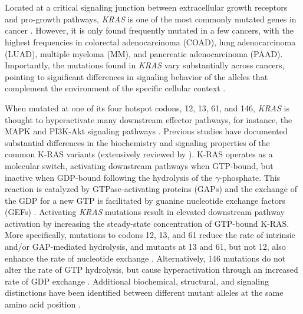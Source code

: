 \documentclass[english, 10pt, letterpaper]{article}
\newcommand{\KRAS}{\emph{KRAS}}
\newcommand{\kras}{K-RAS}
\begin{document}
\section*{}

Located at a critical signaling junction between extracellular growth receptors and pro-growth pathways, \KRAS{} is one of the most commonly mutated genes in cancer \cite{Simanshu2017, Bailey2018}.
However, it is only found frequently mutated in a few cancers, with the highest frequencies in colorectal adenocarcinoma (COAD), lung adenocarcinoma (LUAD), multiple myeloma (MM), and pancreatic adenocarcinoma (PAAD).
Importantly, the mutations found in \KRAS{} vary substantially across cancers, pointing to significant differences in signaling behavior of the alleles that complement the environment of the specific cellular context \cite{Haigis2017, Poulin2019}.

When mutated at one of its four hotspot codons, 12, 13, 61, and 146, \KRAS{} is thought to hyperactivate many downstream effector pathways, for instance, the MAPK and PI3K-Akt signaling pathways \cite{Simanshu2017}.
Previous studies have documented substantial differences in the biochemistry and signaling properties of the common \kras{} variants (extensively reviewed by \cite{Miller2012, Li2018}).
\kras{} operates as a molecular switch, activating downstream pathways when GTP-bound, but inactive when GDP-bound following the hydrolysis of the $\gamma$-phosphate.
This reaction is catalyzed by GTPase-activating proteins (GAPs) and the exchange of the GDP for a new GTP is facilitated by guanine nucleotide exchange factors (GEFs) \cite{Barbacid1987}.
Activating \KRAS{} mutations result in elevated downstream pathway activation by increasing the steady-state concentration of GTP-bound \kras{}.
More specifically, mutations to codons 12, 13, and 61 reduce the rate of intrinsic and/or GAP-mediated hydrolysis, and mutants at 13 and 61, but not 12, also enhance the rate of nucleotide exchange \cite{Hunter2015a, Smith2013}.
Alternatively, 146 mutations do not alter the rate of GTP hydrolysis, but cause hyperactivation through an increased rate of GDP exchange \cite{Feig1988RelationshipProteins., Edkins2006, Janakiraman2010, Poulin2019}.
Additional biochemical, structural, and signaling distinctions have been identified between different mutant alleles at the same amino acid position \cite{Li2018, Hunter2015a, Poulin2019, Hobbs2019AtypicalCancer., Yu2018, Kovalski2019, Ihle2012, Spoerner2004, Smith2014a, Pantsar2018}.
\end{document}
